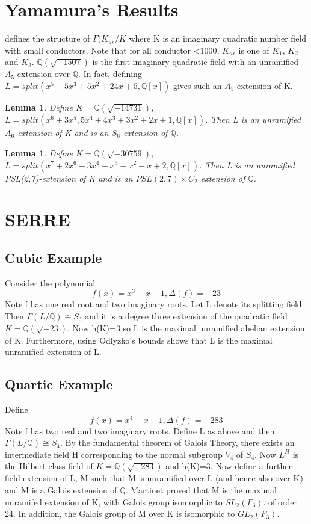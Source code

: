 \documentclass[preprint,12pt,reqno]{elsarticle}
\newtheorem{lemma}[theorem]{Lemma}
\begin{document}
\section{Yamamura's Results}
\cite{YAM2} defines the structure of $\Gamma(K_{ur}/K$ where K is an imaginary quadratic number field with small conductors. Note that for all conductor <1000, $K_{ur}$ is one of $K_1$, $K_2$ and $K_3$. 
$\mathbb{Q}(\sqrt{-1507})$ is the first imaginary quadratic field with an unramified $A_5$-extension over $\mathbb{Q}$. In fact, defining $L=split(x^5-5x^3+5x^2+24x+5,\mathbb{Q}[x])$ gives such an $A_5$ extension of K. 
\begin{lemma}
Define $K=\mathbb{Q}(\sqrt{-14731})$, $L=split(x^6+3x^5,5x^4+4x^3+3x^2+2x+1,\mathbb{Q}[x])$. Then L is an unramified $A_6$-extension of K and is an $S_6$ extension of $\mathbb{Q}$.
\end{lemma}
\begin{lemma}
Define $K=\mathbb{Q}(\sqrt{-30759})$, $L=split(x^7+2x^6-3x^4-x^3-x^2-x+2,\mathbb{Q}[x])$. Then L is an unramified PSL(2,7)-extension of K and is an $PSL(2,7)\times C_2$ extension of $\mathbb{Q}$.
\end{lemma}
\section{SERRE}
\subsection{Cubic Example}
Consider the polynomial \begin{equation}
 f(x)=x^3-x-1, \Delta(f)=-23
\end{equation}
Note f has one real root and two imaginary roots. Let L denote its splitting field. Then $\Gamma(L/\mathbb{Q})\cong S_3$ and it is a degree three extension of the quadratic field $K= \mathbb{Q}(\sqrt{-23})$. Now h(K)=3 so L is the maximal unramified abelian extension of K. Furthermore, using Odlyzko's bounds shows that L is the maximal unramified extension of L. 
\subsection{Quartic Example}
Define  \begin{equation}
    f(x)=x^4-x-1, \Delta(f)=-283
\end{equation}
Note f has two real and two imaginary roots. Define L as above and then $\Gamma(L/\mathbb{Q})\cong S_4$. By the fundamental theorem of Galois Theory, there exists an intermediate field H corresponding to the normal subgroup $V_4$ of $S_4$. Now $L^H$ is the Hilbert class field of $K= \mathbb{Q}(\sqrt{-283})$ and h(K)=3. Now define a further field extension of L, M such that M is unramified over L (and hence also over K) and M is a Galois extension of $\mathbb{Q}$. Martinet proved that M is the maximal unramifed extension of K, with Galois group isomorphic to $SL_2(F_3)$. of order 24. In addition, the Galois group of M over K is isomorphic to $GL_2(F_3)$.
\end{document}
